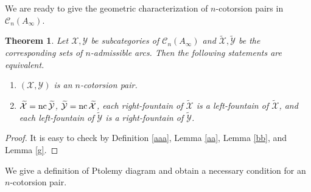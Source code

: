 \documentclass[a4paper,reqno,11pt]{amsart}
\newtheorem{theorem}{Theorem}[section]
\theoremstyle{definition}
\def\C{\mathcal{C}}
\def\X{\mathcal{X}}
\def\Y{\mathcal{Y}}
\providecommand{\nc}{\mathop{\rm nc}\nolimits}%
\def\XX{\widetilde{\X}}
\def\YY{\widetilde{\Y}}
\begin{document}
We are ready to give the geometric characterization of $n$-cotorsion pairs in $\C_n(A_{\infty})$.
\begin{theorem}\label{dd}
Let $\X,\Y$ be subcategories of $\C_n(A_{\infty})$ and $\XX,\YY$ be the corresponding sets of $n$-admissible arcs. Then the following statements are equivalent.
\begin{enumerate}

  \item[\rm (1)]  $(\X,\Y)$ is an $n$-cotorsion pair.

\smallskip

  \item[\rm (2)] $\XX=\nc\YY$, $\YY=\nc\XX$,  each right-fountain of $\XX$ is a left-fountain of $\XX$, and each left-fountain of $\YY$ is a right-fountain of $\YY$.
\end{enumerate}
\end{theorem}
\begin{proof}
It is easy to check by Definition \ref{aaa}, Lemma \ref{aa}, Lemma \ref{bb}, and Lemma \ref{g}.
\end{proof}

We give a definition of Ptolemy diagram and obtain a necessary condition for an $n$-cotorsion pair.
\end{document}
